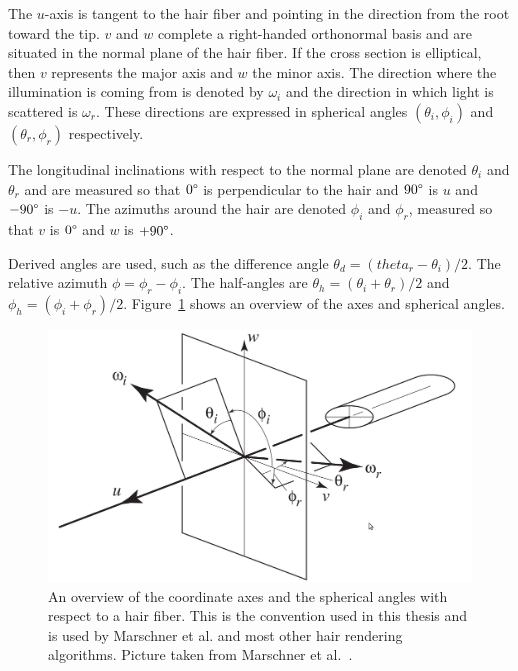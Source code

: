 \documentclass[11pt,a4paper]{report}
\begin{document}
The $u$-axis is tangent to the hair fiber and pointing in the direction from the root toward the tip. $v$ and $w$ complete a right-handed orthonormal basis and are situated in the normal plane of the hair fiber. If the cross section is elliptical, then  $v$ represents the major axis and $w$ the minor axis. The direction where the illumination is coming from is denoted by $\omega_i$ and the direction in which light is scattered is $\omega_r$. These directions are expressed in spherical angles $(\theta_i, \phi_i)$ and $(\theta_r,\phi_r)$ respectively.

The longitudinal inclinations with respect to the normal plane are denoted $\theta_i$ and $\theta_r$ and are measured so that $0\degree$ is perpendicular to the hair and $90\degree$ is $u$ and $-90\degree$ is $-u$. The azimuths around the hair are denoted $\phi_i$ and $\phi_r$, measured so that $v$ is $0\degree$ and $w$ is $+90\degree$.

Derived angles are used, such as the difference angle $\theta_d = (theta_r - \theta_i)/2$. The relative azimuth $\phi = \phi_r - \phi_i$. The half-angles are $\theta_h = (\theta_i + \theta_r)/2$ and $\phi_h = (\phi_i + \phi_r)/2$. Figure~\ref{axis_overview} shows an overview of the axes and spherical angles.

\begin{center}
\begin{figure}

\includegraphics[scale=.4]{images/axes.jpeg}

\caption{An overview of the coordinate axes and the spherical angles with respect to a hair fiber. This is the convention used in this thesis and is used by Marschner et al. and most other hair rendering algorithms. Picture taken from Marschner et al.~\cite{marschner}.}
\label{axis_overview}

\end{figure}
\end{center}
\end{document}

